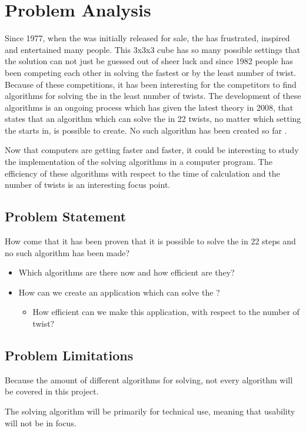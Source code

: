 \chapter{Problem Analysis}
Since 1977, when the \rubik{} was initially released for sale, the \rubik{} has frustrated, inspired and entertained many people. This 3x3x3 cube has so many possible settings that the solution can not just be guessed out of sheer luck and since 1982 people has been competing each other in solving the \rubik{} fastest or by the least number of twist. Because of these competitions, it has been interesting for the competitors to find algorithms for solving the \rubik{} in the least number of twists. The development of these algorithms is an ongoing process which has given the latest theory in 2008, that states that an algorithm which can solve the \rubik{} in 22 twists, no matter which setting the \rubik{} starts in, is possible to create. No such algorithm has been created so far \cite{}.

Now that computers are getting faster and faster, it could be interesting to study the implementation of the solving algorithms in a computer program. The efficiency of these algorithms with respect to the time of calculation and the number of twists is an interesting focus point.

\section{Problem Statement}
How come that it has been proven that it is possible to solve the \rubik{} in 22 steps and no such algorithm has been made?
\begin{itemize}
	\item Which algorithms are there now and how efficient are they?
	\item How can we create an application which can solve the \rubik{}?
	\begin{itemize}
		\item How efficient can we make this application, with respect to the number of twist?
	\end{itemize}
\end{itemize}

\section{Problem Limitations}
Because the amount of different algorithms for \rubik{} solving, not every algorithm will be covered in this project.

The \rubik{} solving algorithm will be primarily for technical use, meaning that usability will not be in focus.